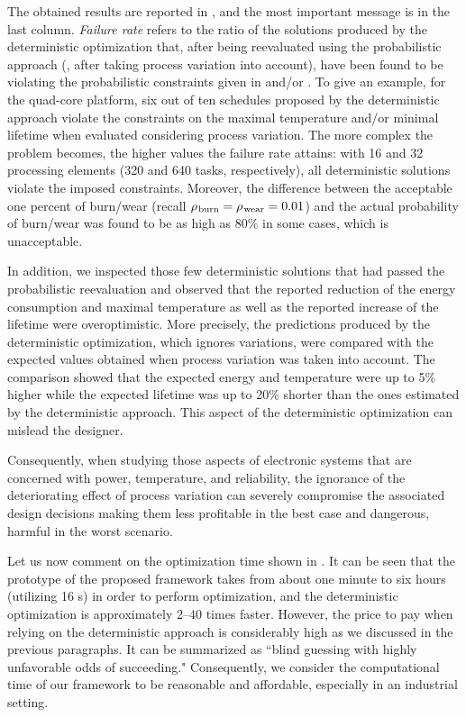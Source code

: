 The obtained results are reported in , and the most important message is in the last column.
\emph{Failure rate} refers to the ratio of the solutions produced by the deterministic optimization that, after being reevaluated using the probabilistic approach (\ie, after taking process variation into account), have been found to be violating the probabilistic constraints given in  and/or .
To give an example, for the quad-core platform, six out of ten schedules proposed by the deterministic approach violate the constraints on the maximal temperature and/or minimal lifetime when evaluated considering process variation.
The more complex the problem becomes, the higher values the failure rate attains: with 16 and 32 processing elements (320 and 640 tasks, respectively), all deterministic solutions violate the imposed constraints.
Moreover, the difference between the acceptable one percent of burn/wear (recall $\rho_{\text{\kern0.1emburn}} = \rho_{\text{\kern0.1emwear}} = 0.01$) and the actual probability of burn/wear was found to be as high as 80\% in some cases, which is unacceptable.

In addition, we inspected those few deterministic solutions that had passed the probabilistic reevaluation and observed that the reported reduction of the energy consumption and maximal temperature as well as the reported increase of the lifetime were overoptimistic.
More precisely, the predictions produced by the deterministic optimization, which ignores variations, were compared with the expected values obtained when process variation was taken into account.
The comparison showed that the expected energy and temperature were up to 5\% higher while the expected lifetime was up to 20\% shorter than the ones estimated by the deterministic approach.
This aspect of the deterministic optimization can mislead the designer.

Consequently, when studying those aspects of electronic systems that are concerned with power, temperature, and reliability, the ignorance of the deteriorating effect of process variation can severely compromise the associated design decisions making them less profitable in the best case and dangerous, harmful in the worst scenario.

Let us now comment on the optimization time shown in .
It can be seen that the prototype of the proposed framework takes from about one minute to six hours (utilizing 16 s) in order to perform optimization, and the deterministic optimization is approximately 2--40 times faster.
However, the price to pay when relying on the deterministic approach is considerably high as we discussed in the previous paragraphs.
It can be summarized as ``blind guessing with highly unfavorable odds of succeeding."
Consequently, we consider the computational time of our framework to be reasonable and affordable, especially in an industrial setting.

